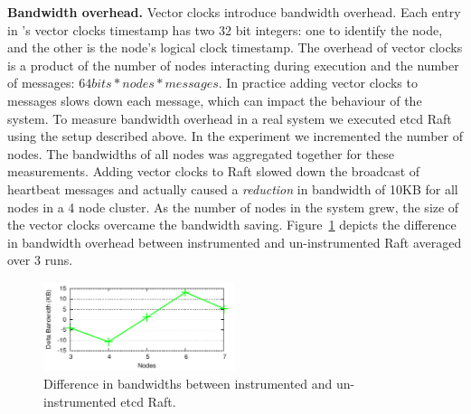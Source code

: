 
\textbf{Bandwidth overhead.} Vector clocks introduce bandwidth
overhead. Each entry in \dinv's vector clocks timestamp has two 32 bit
integers: one to identify the node, and the other is the node's
logical clock timestamp. The overhead of vector clocks is a product of
the number of nodes interacting during execution and the number of
messages: $64bits * nodes * messages$. In practice adding vector
clocks to messages slows down each message, which can impact the
behaviour of the system. To measure bandwidth overhead in a real
system we executed etcd Raft using the setup described above. In the
experiment we incremented the number of nodes. The bandwidths of all
nodes was aggregated together for these measurements. Adding vector
clocks to Raft slowed down the broadcast of heartbeat messages and
actually caused a \emph{reduction} in bandwidth of 10KB for all nodes
in a 4 node cluster.  As the number of nodes in the system grew, the
size of the vector clocks overcame the bandwidth saving.
Figure~\ref{fig:bandwidth-overhead} depicts the difference in
bandwidth overhead between instrumented and un-instrumented Raft
averaged over 3 runs.

%



\begin{figure}[h]
    \includegraphics[width=0.50\textwidth]{fig/bandwidth-overhead}
    \caption{Difference in bandwidths between instrumented and un-instrumented etcd Raft.}
    \label{fig:bandwidth-overhead}
\end{figure}

